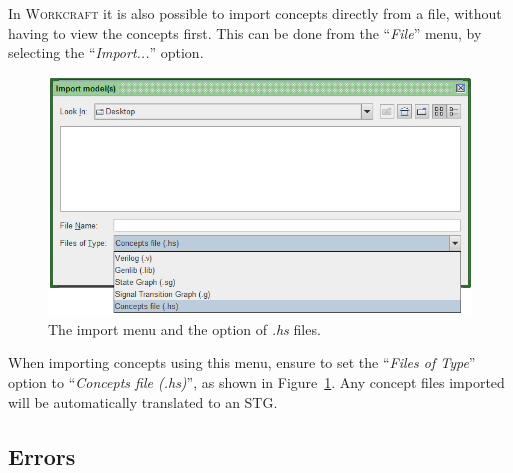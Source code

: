 \documentclass[british,conference,compsoc]{IEEEtran}
\newcommand{\noun}[1]{\textsc{#1}}
\begin{document}
\vspace{-2mm}

In \noun{Workcraft} it is also possible to import concepts directly from a file,
without having to view the concepts first. This can be done from the 
``\emph{File}'' menu, by selecting the ``\emph{Import...}'' option. 

\begin{figure}[H]
\begin{centering}
\vspace{-3mm}
\includegraphics[scale=0.4]{Images/import_menu_screenshot.png}
\par\end{centering}

\begin{centering}
\protect\caption{\label{fig:import_menu_screenshot}The import menu and the 
			option of \emph{.hs} files.}

\par\end{centering}
\vspace{-3mm}
\end{figure}

When importing concepts using this menu, ensure to set the 
``\emph{Files of Type}'' option to ``\emph{Concepts file (.hs)}'', as shown in 
Figure~\ref{fig:import_menu_screenshot}. Any concept files imported will be
automatically translated to an STG.

\vspace{-3mm}

\subsection{Errors}

\vspace{-2mm}
\end{document}
